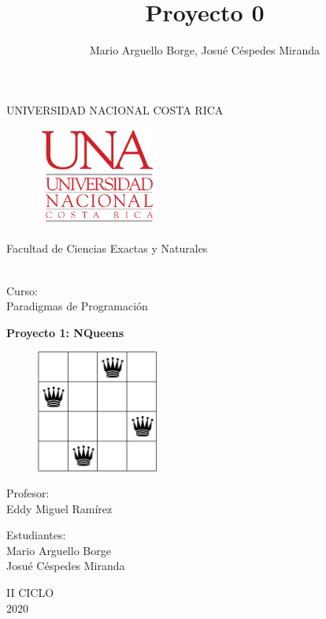 \documentclass[12pt,a4paper]{article}
\author{Mario Arguello Borge, Josué Céspedes Miranda}
\title{Proyecto 0}
\begin{document}
\begin{titlepage}
\begin{center}
\begin{large}
UNIVERSIDAD NACIONAL COSTA RICA \\
\begin{figure}[htp]
\centering
\includegraphics[width=4cm]{imagenes/240px-UNA.png} 
\label{foto}
\end{figure}
\end{large}
\begin{large}
Facultad de Ciencias Exactas y Naturales
\end{large} 
\begin{large}
\vspace*{1cm}\\
Curso:\\
\vspace*{2mm}
Paradigmas de Programación\\
\end{large}
\vspace*{8mm}
\begin{large}
\textbf{Proyecto 1: 
NQueens
}\\
\end{large}
\begin{figure}[htp]
\centering
\includegraphics[width=4cm]{imagenes/queens.png} 
\end{figure}
\begin{large}
\vspace*{1cm}
Profesor:\\
\vspace*{5mm}
Eddy Miguel Ramírez\\
\end{large}
\begin{large}
\vspace*{1cm}
Estudiantes: \\
\vspace*{5mm}
Mario Arguello Borge \\
Josué Céspedes Miranda \\
\end{large}
\vspace*{1cm}
II CICLO\\
\vspace*{1cm}
2020
\end{center}
\end{titlepage}
\tableofcontents
\pagebreak
\end{document}
